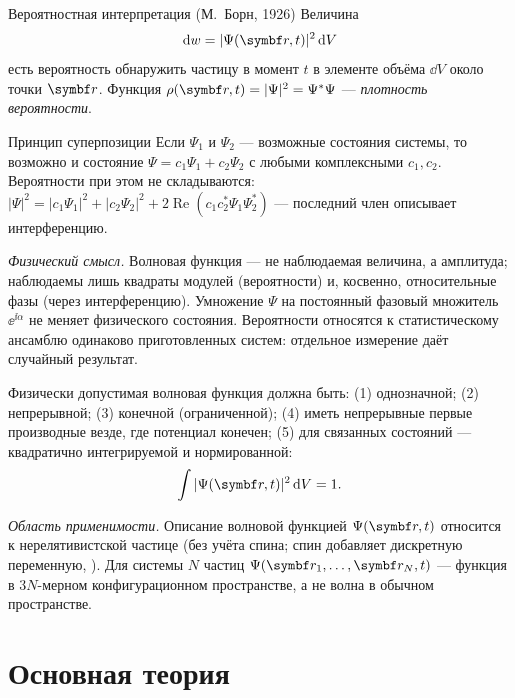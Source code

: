 \begin{principle}{Вероятностная интерпретация (М.~Борн, 1926)}
Величина
\begin{equation}\label{eq:4:born}
  \dd w=|\Psi(\vect r,t)|^2\,\dd V
\end{equation}
есть вероятность обнаружить частицу в момент $t$ в элементе объёма $\dd V$ около точки $\vect r$.
Функция $\rho(\vect r,t)=|\Psi|^2=\Psi^*\Psi$ — \emph{плотность вероятности}.
\end{principle}

\begin{principle}{Принцип суперпозиции}
Если $\Psi_1$ и $\Psi_2$ — возможные состояния системы, то возможно и состояние
$\Psi=c_1\Psi_1+c_2\Psi_2$ с любыми комплексными $c_1,c_2$. Вероятности при этом не
складываются: $|\Psi|^2=|c_1\Psi_1|^2+|c_2\Psi_2|^2+2\operatorname{Re}(c_1c_2^*\Psi_1\Psi_2^*)$ —
последний член описывает интерференцию.
\end{principle}

\emph{Физический смысл.} Волновая функция — не наблюдаемая величина, а амплитуда; наблюдаемы
лишь квадраты модулей (вероятности) и, косвенно, относительные фазы (через интерференцию).
Умножение $\Psi$ на постоянный фазовый множитель $\ee^{\ii\alpha}$ не меняет физического
состояния. Вероятности относятся к статистическому ансамблю одинаково приготовленных систем:
отдельное измерение даёт случайный результат.

\begin{definition}
Физически допустимая волновая функция должна быть: (1) однозначной; (2) непрерывной;
(3) конечной (ограниченной); (4) иметь непрерывные первые производные везде, где
потенциал конечен; (5) для связанных состояний — квадратично интегрируемой и нормированной:
\begin{equation}\label{eq:4:norm}
  \int|\Psi(\vect r,t)|^2\,\dd V=1 .
\end{equation}
\end{definition}

\emph{Область применимости.} Описание волновой функцией $\Psi(\vect r,t)$ относится к
нерелятивистской частице (без учёта спина; спин добавляет дискретную переменную, ).
Для системы $N$ частиц $\Psi(\vect r_1,\dots,\vect r_N,t)$ — функция в $3N$-мерном
конфигурационном пространстве, а не волна в обычном пространстве.

\section{Основная теория}


